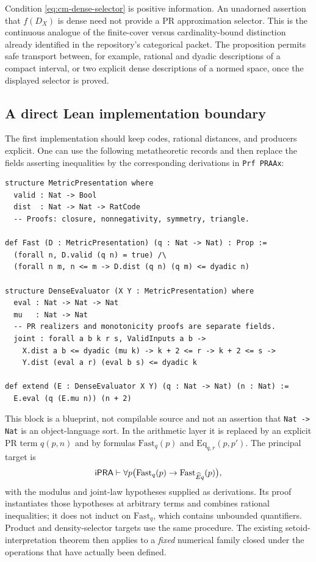 Condition \eqref{eq:cm-dense-selector} is positive information.  An unadorned
assertion that $f(D_X)$ is dense need not provide a PR approximation selector.
This is the continuous analogue of the finite-cover versus cardinality-bound
distinction already identified in the repository's categorical packet.
The proposition permits safe transport between, for example, rational and
dyadic descriptions of a compact interval, or two explicit dense descriptions
of a normed space, once the displayed selector is proved.

\subsection{A direct Lean implementation boundary}

The first implementation should keep codes, rational distances, and producers
explicit.  One can use the following metatheoretic records and then replace
the fields asserting inequalities by the corresponding derivations in
\texttt{Prf PRAAx}:
\begin{verbatim}
structure MetricPresentation where
  valid : Nat -> Bool
  dist  : Nat -> Nat -> RatCode
  -- Proofs: closure, nonnegativity, symmetry, triangle.

def Fast (D : MetricPresentation) (q : Nat -> Nat) : Prop :=
  (forall n, D.valid (q n) = true) /\
  (forall n m, n <= m -> D.dist (q n) (q m) <= dyadic n)

structure DenseEvaluator (X Y : MetricPresentation) where
  eval : Nat -> Nat -> Nat
  mu   : Nat -> Nat
  -- PR realizers and monotonicity proofs are separate fields.
  joint : forall a b k r s, ValidInputs a b ->
    X.dist a b <= dyadic (mu k) -> k + 2 <= r -> k + 2 <= s ->
    Y.dist (eval a r) (eval b s) <= dyadic k

def extend (E : DenseEvaluator X Y) (q : Nat -> Nat) (n : Nat) :=
  E.eval (q (E.mu n)) (n + 2)
\end{verbatim}

This block is a blueprint, not compilable source and not an assertion that
\texttt{Nat -> Nat} is an object-language sort.  In the arithmetic layer it is
replaced by an explicit PR term $q(p,n)$ and by formulas
$\mathrm{Fast}_q(p)$ and $\mathrm{Eq}_{q,r}(p,p')$.  The principal target is
\[
 \mathsf{iPRA}\vdash\forall p\bigl(\mathrm{Fast}_q(p)
                  \to\mathrm{Fast}_{\widehat E q}(p)\bigr),
\]
with the modulus and joint-law hypotheses supplied as derivations.  Its proof
instantiates those hypotheses at arbitrary terms and combines rational
inequalities; it does not induct on $\mathrm{Fast}_q$, which contains
unbounded quantifiers.  Product and density-selector targets use the same
procedure.  The existing setoid-interpretation theorem then applies to a
\emph{fixed} numerical family closed under the operations that have actually
been defined.

